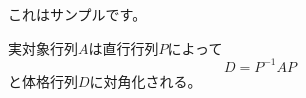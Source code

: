 \documentclass{jsarticle}
\begin{document}
 

これはサンプルです。

実対象行列$A$は直行行列$P$によって
\[
    D = P^{-1}A P
\]
と体格行列$D$に対角化される。
\end{document}
